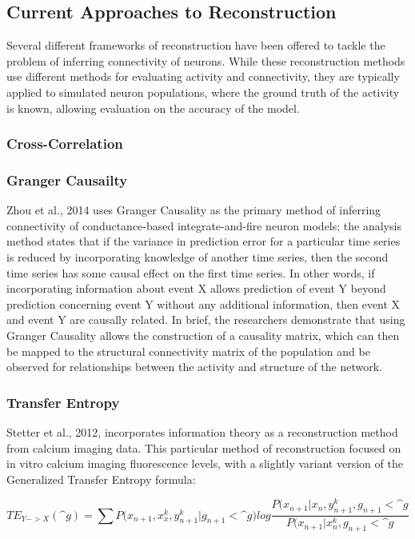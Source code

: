 \documentclass{article}
\begin{document}
\subsection{Current Approaches to Reconstruction}
Several different frameworks of reconstruction have been offered to tackle the problem of inferring connectivity of neurons. While these reconstruction methods use different methods for evaluating activity and connectivity, they are typically applied to simulated neuron populations, where the ground truth of the activity is known, allowing evaluation on the accuracy of the model.\par

\subsubsection{Cross-Correlation}


\subsubsection{Granger Causailty}
Zhou et al., 2014 uses Granger Causality as the primary method of inferring connectivity of conductance-based integrate-and-fire neuron models; the analysis method states that if the variance in prediction error for a particular time series is reduced by incorporating knowledge of another time series, then the second time series has some causal effect on the first time series. In other words, if incorporating information about event X allows prediction of event Y beyond prediction concerning event Y without any additional information, then event X and event Y are causally related.  In brief, the researchers demonstrate that using Granger Causality allows the construction of a causality matrix, which can then be mapped to the structural connectivity matrix of the population and be observed for relationships between the activity and structure of the network.\par

\subsubsection{Transfer Entropy}
Stetter et al., 2012, incorporates information theory as a reconstruction method from calcium imaging data. This particular method of reconstruction focused on in vitro calcium imaging fluorescence levels, with a slightly variant version of the Generalized Transfer Entropy formula:

$$TE_{Y->X}(\^{g}) = \sum{P(x_{n+1}, x_x^k,y_{n+1}^k|g_{n+1}<\^{g}}) log \frac{P(x_{n+1}|x_n,y_{n+1}^k,g_{n+1}<\^{g}}{P(x_{n+1}|x_n^k,g_{n+1}<\^{g}}$$
\end{document}
